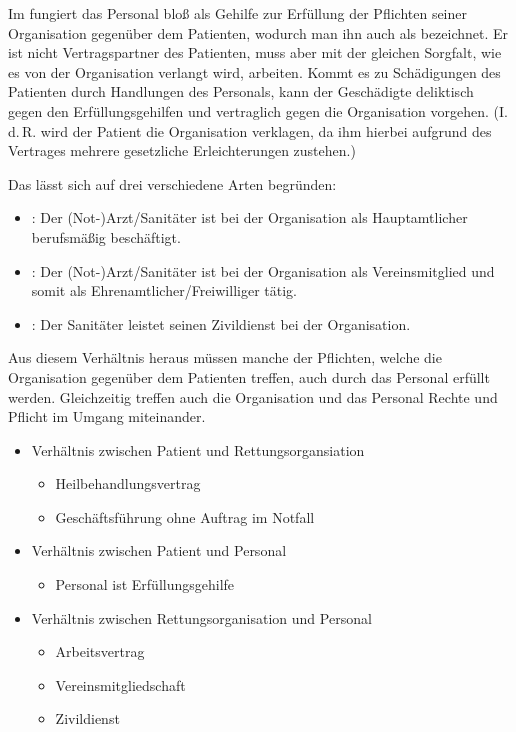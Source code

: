 {Im 
fungiert das Personal bloß als Gehilfe zur Erfüllung der
Pflichten seiner Organisation gegenüber dem Patienten,
wodurch man ihn auch als
 bezeichnet. Er ist
nicht Vertragspartner des Patienten, muss aber mit der
gleichen Sorgfalt, wie es von der Organisation verlangt
wird, arbeiten. Kommt es zu Schädigungen des Patienten durch
Handlungen des Personals, kann der Geschädigte deliktisch
gegen den Erfüllungsgehilfen und vertraglich gegen die
Organisation vorgehen. (I.\,d.\,R. wird der Patient die
Organisation verklagen, da ihm hierbei aufgrund des
Vertrages mehrere gesetzliche Erleichterungen zustehen.)

Das  lässt sich auf drei verschiedene Arten begründen:

\begin{itemize}
    \item {}: Der (Not-)Arzt/Sanitäter ist
    bei der Organisation als Hauptamtlicher berufsmäßig
    beschäftigt.
    
    \item {}: Der
    (Not-)Arzt/Sanitäter ist bei der Organisation als
    Vereinsmitglied und somit als
    Ehrenamtlicher/Freiwilliger tätig.
    
    \item {}: Der Sanitäter leistet seinen
    Zivildienst bei der Organisation.
    
\end{itemize}

Aus diesem Verhältnis heraus müssen manche der Pflichten,
welche die Organisation gegenüber dem Patienten treffen,
auch durch das Personal erfüllt werden. Gleichzeitig treffen
auch die Organisation und das Personal Rechte und Pflicht im
Umgang miteinander.
}{
\begin{itemize}
  \item Verhältnis zwischen Patient und Rettungsorgansiation
  \begin{itemize}
    \item Heilbehandlungsvertrag
    \item Geschäftsführung ohne Auftrag im Notfall
  \end{itemize}
  \item Verhältnis zwischen Patient und Personal
  \begin{itemize}
    \item Personal ist Erfüllungsgehilfe
  \end{itemize}
  \item Verhältnis zwischen Rettungsorganisation und
  Personal
  \begin{itemize}
    \item Arbeitsvertrag
    \item Vereinsmitgliedschaft
    \item Zivildienst
  \end{itemize}
\end{itemize}
}{}{}{}

